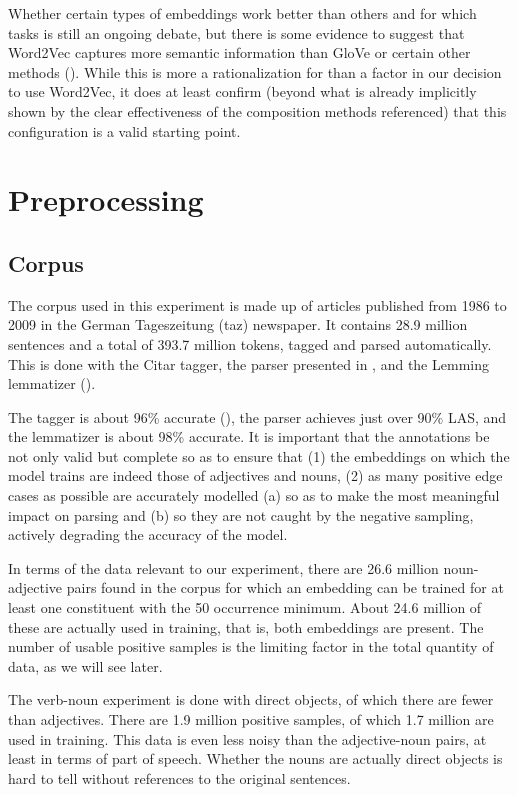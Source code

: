 \documentclass[a4paper, 12pt]{article}
\begin{document}
Whether certain types of embeddings work better than others and for which tasks is still an ongoing debate, but there is some evidence to suggest that Word2Vec captures more semantic information than GloVe or certain other methods (\cite{SchnabelEmbeddings}). While this is more a rationalization for than a factor in our decision to use Word2Vec, it does at least confirm (beyond what is already implicitly shown by the clear effectiveness of the composition methods referenced) that this configuration is a valid starting point.


\section{Preprocessing}

\subsection{Corpus}

The corpus used in this experiment is made up of articles published from 1986 to 2009 in the German Tageszeitung (taz) newspaper. It contains 28.9 million sentences and a total of 393.7 million tokens, tagged and parsed automatically. This is done with the Citar tagger, the parser presented in \cite{deKokParsing}, and the Lemming lemmatizer (\cite{Lemming}).

The tagger is about 96\% accurate (\cite{PlankVanNoord}), the parser achieves just over 90\% LAS, and the lemmatizer is about 98\% accurate. It is important that the annotations be not only valid but complete so as to ensure that (1) the embeddings on which the model trains are indeed those of adjectives and nouns, (2) as many positive edge cases as possible are accurately modelled (a) so as to make the most meaningful impact on parsing and (b) so they are not caught by the negative sampling, actively degrading the accuracy of the model.

In terms of the data relevant to our experiment, there are 26.6 million noun-adjective pairs found in the corpus for which an embedding can be trained for at least one constituent with the 50 occurrence minimum. About 24.6 million of these are actually used in training, that is, both embeddings are present. The number of usable positive samples is the limiting factor in the total quantity of data, as we will see later.

The verb-noun experiment is done with direct objects, of which there are fewer than adjectives. There are 1.9 million positive samples, of which 1.7 million are used in training. This data is even less noisy than the adjective-noun pairs, at least in terms of part of speech. Whether the nouns are actually direct objects is hard to tell without references to the original sentences.
\end{document}
